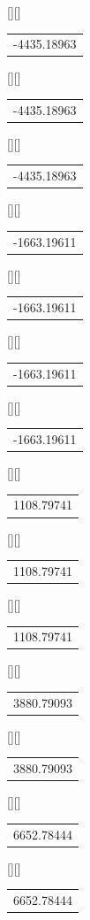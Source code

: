 \begin{psfrags}
[][]{\color[rgb]{0,0,0}\setlength{\tabcolsep}{0pt}\begin{tabular}{c}-4435.18963\end{tabular}}%
[][]{\color[rgb]{0,0,0}\setlength{\tabcolsep}{0pt}\begin{tabular}{c}-4435.18963\end{tabular}}%
[][]{\color[rgb]{0,0,0}\setlength{\tabcolsep}{0pt}\begin{tabular}{c}-4435.18963\end{tabular}}%
[][]{\color[rgb]{0,0,0}\setlength{\tabcolsep}{0pt}\begin{tabular}{c}-1663.19611\end{tabular}}%
[][]{\color[rgb]{0,0,0}\setlength{\tabcolsep}{0pt}\begin{tabular}{c}-1663.19611\end{tabular}}%
[][]{\color[rgb]{0,0,0}\setlength{\tabcolsep}{0pt}\begin{tabular}{c}-1663.19611\end{tabular}}%
[][]{\color[rgb]{0,0,0}\setlength{\tabcolsep}{0pt}\begin{tabular}{c}-1663.19611\end{tabular}}%
[][]{\color[rgb]{0,0,0}\setlength{\tabcolsep}{0pt}\begin{tabular}{c}1108.79741\end{tabular}}%
[][]{\color[rgb]{0,0,0}\setlength{\tabcolsep}{0pt}\begin{tabular}{c}1108.79741\end{tabular}}%
[][]{\color[rgb]{0,0,0}\setlength{\tabcolsep}{0pt}\begin{tabular}{c}1108.79741\end{tabular}}%
[][]{\color[rgb]{0,0,0}\setlength{\tabcolsep}{0pt}\begin{tabular}{c}3880.79093\end{tabular}}%
[][]{\color[rgb]{0,0,0}\setlength{\tabcolsep}{0pt}\begin{tabular}{c}3880.79093\end{tabular}}%
[][]{\color[rgb]{0,0,0}\setlength{\tabcolsep}{0pt}\begin{tabular}{c}6652.78444\end{tabular}}%
[][]{\color[rgb]{0,0,0}\setlength{\tabcolsep}{0pt}\begin{tabular}{c}6652.78444\end{tabular}}%

\end{psfrags}
